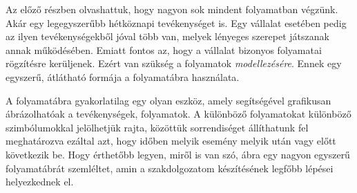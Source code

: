 
Az előző részben olvashattuk, hogy nagyon sok mindent folyamatban végzünk. Akár egy legegyszerűbb hétköznapi tevékenységet is. Egy vállalat esetében pedig az ilyen tevékenységekből jóval több van, melyek lényeges szerepet játszanak annak működésében. Emiatt fontos az, hogy a vállalat bizonyos folyamatai rögzítésre kerüljenek. Ezért van szükség a folyamatok \textit{modellezésére}. Ennek egy egyszerű, átlátható formája a folyamatábra használata.


A folyamatábra gyakorlatilag egy olyan eszköz, amely segítségével grafikusan ábrázolhatóak a tevékenységek, folyamatok. A különböző folyamatokat különböző szimbólumokkal jelölhetjük rajta, közöttük sorrendiséget állíthatunk fel meghatározva ezáltal azt, hogy időben melyik esemény melyik után vagy előtt következik be. Hogy érthetőbb legyen, miről is van szó,  ábra egy nagyon egyszerű folyamatábrát szemléltet, amin a szakdolgozatom készítésének legfőbb lépései helyezkednek el.

